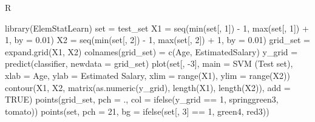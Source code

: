 \documentclass[
]{book}
\newenvironment{Shaded}{\begin{snugshade}}{\end{snugshade}}
\newcommand{\AttributeTok}[1]{\textcolor[rgb]{0.77,0.63,0.00}{#1}}
\newcommand{\ConstantTok}[1]{\textcolor[rgb]{0.00,0.00,0.00}{#1}}
\newcommand{\DecValTok}[1]{\textcolor[rgb]{0.00,0.00,0.81}{#1}}
\newcommand{\FloatTok}[1]{\textcolor[rgb]{0.00,0.00,0.81}{#1}}
\newcommand{\FunctionTok}[1]{\textcolor[rgb]{0.00,0.00,0.00}{#1}}
\newcommand{\NormalTok}[1]{#1}
\newcommand{\OtherTok}[1]{\textcolor[rgb]{0.56,0.35,0.01}{#1}}
\newcommand{\SpecialCharTok}[1]{\textcolor[rgb]{0.00,0.00,0.00}{#1}}
\newcommand{\StringTok}[1]{\textcolor[rgb]{0.31,0.60,0.02}{#1}}
\theoremstyle{definition}
\theoremstyle{definition}
\theoremstyle{definition}
\theoremstyle{definition}
\theoremstyle{remark}
\begin{document}
R

\begin{Shaded}
\begin{Highlighting}[]
\FunctionTok{library}\NormalTok{(ElemStatLearn)}
\NormalTok{set }\OtherTok{=}\NormalTok{ test\_set}
\NormalTok{X1 }\OtherTok{=} \FunctionTok{seq}\NormalTok{(}\FunctionTok{min}\NormalTok{(set[, }\DecValTok{1}\NormalTok{]) }\SpecialCharTok{{-}} \DecValTok{1}\NormalTok{, }\FunctionTok{max}\NormalTok{(set[, }\DecValTok{1}\NormalTok{]) }\SpecialCharTok{+} \DecValTok{1}\NormalTok{, }\AttributeTok{by =} \FloatTok{0.01}\NormalTok{)}
\NormalTok{X2 }\OtherTok{=} \FunctionTok{seq}\NormalTok{(}\FunctionTok{min}\NormalTok{(set[, }\DecValTok{2}\NormalTok{]) }\SpecialCharTok{{-}} \DecValTok{1}\NormalTok{, }\FunctionTok{max}\NormalTok{(set[, }\DecValTok{2}\NormalTok{]) }\SpecialCharTok{+} \DecValTok{1}\NormalTok{, }\AttributeTok{by =} \FloatTok{0.01}\NormalTok{)}
\NormalTok{grid\_set }\OtherTok{=} \FunctionTok{expand.grid}\NormalTok{(X1, X2)}
\FunctionTok{colnames}\NormalTok{(grid\_set) }\OtherTok{=} \FunctionTok{c}\NormalTok{(}\StringTok{\textquotesingle{}Age\textquotesingle{}}\NormalTok{, }\StringTok{\textquotesingle{}EstimatedSalary\textquotesingle{}}\NormalTok{)}
\NormalTok{y\_grid }\OtherTok{=} \FunctionTok{predict}\NormalTok{(classifier, }\AttributeTok{newdata =}\NormalTok{ grid\_set)}
\FunctionTok{plot}\NormalTok{(set[, }\SpecialCharTok{{-}}\DecValTok{3}\NormalTok{], }\AttributeTok{main =} \StringTok{\textquotesingle{}SVM (Test set)\textquotesingle{}}\NormalTok{,}
     \AttributeTok{xlab =} \StringTok{\textquotesingle{}Age\textquotesingle{}}\NormalTok{, }\AttributeTok{ylab =} \StringTok{\textquotesingle{}Estimated Salary\textquotesingle{}}\NormalTok{,}
     \AttributeTok{xlim =} \FunctionTok{range}\NormalTok{(X1), }\AttributeTok{ylim =} \FunctionTok{range}\NormalTok{(X2))}
\FunctionTok{contour}\NormalTok{(X1, X2, }\FunctionTok{matrix}\NormalTok{(}\FunctionTok{as.numeric}\NormalTok{(y\_grid), }\FunctionTok{length}\NormalTok{(X1), }\FunctionTok{length}\NormalTok{(X2)), }\AttributeTok{add =} \ConstantTok{TRUE}\NormalTok{)}
\FunctionTok{points}\NormalTok{(grid\_set, }\AttributeTok{pch =} \StringTok{\textquotesingle{}.\textquotesingle{}}\NormalTok{, }\AttributeTok{col =} \FunctionTok{ifelse}\NormalTok{(y\_grid }\SpecialCharTok{==} \DecValTok{1}\NormalTok{, }\StringTok{\textquotesingle{}springgreen3\textquotesingle{}}\NormalTok{, }\StringTok{\textquotesingle{}tomato\textquotesingle{}}\NormalTok{))}
\FunctionTok{points}\NormalTok{(set, }\AttributeTok{pch =} \DecValTok{21}\NormalTok{, }\AttributeTok{bg =} \FunctionTok{ifelse}\NormalTok{(set[, }\DecValTok{3}\NormalTok{] }\SpecialCharTok{==} \DecValTok{1}\NormalTok{, }\StringTok{\textquotesingle{}green4\textquotesingle{}}\NormalTok{, }\StringTok{\textquotesingle{}red3\textquotesingle{}}\NormalTok{))}
\end{Highlighting}
\end{Shaded}
\end{document}
